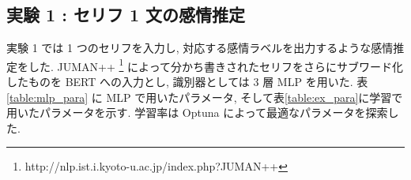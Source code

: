 \documentclass[twocolumn]{jarticle}     %
\begin{document}
\begin{table}[t]
\centering
\caption{データ数}
\label{table:data_size}
\end{table}

\subsection{\small{実験 1 : セリフ 1 文の感情推定}}
実験 1 では 1 つのセリフを入力し, 対応する感情ラベルを出力するような感情推定をした. JUMAN++ \footnote{http://nlp.ist.i.kyoto-u.ac.jp/index.php?JUMAN++} によって分かち書きされたセリフをさらにサブワード化したものを BERT への入力とし, 識別器としては 3 層 MLP を用いた. 表 \ref{table:mlp_para} に MLP で用いたパラメータ, そして表\ref{table:ex_para}に学習で用いたパラメータを示す. 学習率は Optuna \cite{optuna_2019} によって最適なパラメータを探索した.
\end{document}
